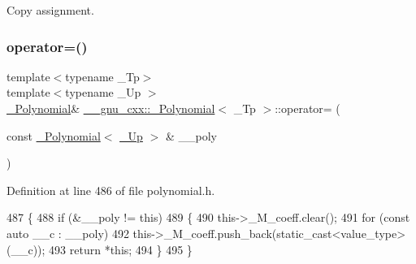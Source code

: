 Copy assignment. \mbox{\label{class____gnu__cxx_1_1__Polynomial_ab3287f4f0300adc76216e7fabeb62d7d}} 
\subsubsection{\texorpdfstring{operator=()}{operator=()}\hspace{0.1cm}{\footnotesize\ttfamily [3/4]}}
{\footnotesize\ttfamily template$<$typename \+\_\+\+Tp$>$ \\
template$<$typename \+\_\+\+Up $>$ \\
\hyperlink{class____gnu__cxx_1_1__Polynomial}{\+\_\+\+Polynomial}\& \hyperlink{class____gnu__cxx_1_1__Polynomial}{\+\_\+\+\_\+gnu\+\_\+cxx\+::\+\_\+\+Polynomial}$<$ \+\_\+\+Tp $>$\+::operator= (\begin{DoxyParamCaption}\item[{const \hyperlink{class____gnu__cxx_1_1__Polynomial}{\+\_\+\+Polynomial}$<$ \hyperlink{class____gnu__cxx_1_1__Polynomial_a242114d4b86648a5dff67a8221f80d40}{\+\_\+\+Up} $>$ \&}]{\+\_\+\+\_\+poly }\end{DoxyParamCaption})\hspace{0.3cm}{\ttfamily [inline]}}



Definition at line 486 of file polynomial.\+h.


\begin{DoxyCode}
487         \{
488           \textcolor{keywordflow}{if} (&\_\_poly != \textcolor{keyword}{this})
489             \{
490               this->\_M\_coeff.clear();
491               \textcolor{keywordflow}{for} (\textcolor{keyword}{const} \textcolor{keyword}{auto} \_\_c : \_\_poly)
492                 this->\_M\_coeff.push\_back(static\_cast<value\_type>(\_\_c));
493               \textcolor{keywordflow}{return} *\textcolor{keyword}{this};
494             \}
495         \}
\end{DoxyCode}
\mbox{\label{class____gnu__cxx_1_1__Polynomial_a44394532a2b1e67f1613b35402da9d47}} 
